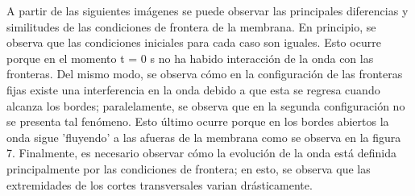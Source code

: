 \documentclass[11pt,letterpaper]{exam}
\begin{document}
A partir de las siguientes im\'agenes se puede observar las principales diferencias y similitudes de las condiciones de frontera de la membrana. En principio, se observa que las condiciones iniciales para cada caso son iguales. Esto ocurre porque en el momento t = 0 s no ha habido interacci\'on de la onda con las fronteras. Del mismo modo, se observa c\'omo en la configuraci\'on de las fronteras fijas existe una interferencia en la onda debido a que esta se regresa cuando alcanza los bordes; paralelamente, se observa que en la segunda configuraci\'on no se presenta tal fen\'omeno. Esto \'ultimo ocurre porque en los bordes abiertos la onda sigue 'fluyendo' a las afueras de la membrana como se observa en la figura 7. Finalmente, es necesario observar c\'omo la evoluci\'on de la onda est\'a definida principalmente por las condiciones de frontera; en esto, se observa que las extremidades de los cortes transversales varian dr\'asticamente. 
\end{document}
